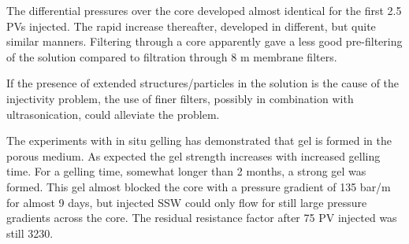 \documentclass[journal = enfuem, manuscript =  article]{achemso}
\begin{document}
The differential pressures over the core developed almost identical for the first 2.5 PVs injected. The rapid increase thereafter, developed in different, but quite similar manners. Filtering through a core apparently gave a less good pre-filtering of the solution compared to filtration through 8 \micro m membrane filters.

If the presence of extended structures/particles in the solution is the cause of the injectivity problem, the use of finer filters, possibly in combination with ultrasonication, could alleviate the problem.

The experiments with in situ gelling has demonstrated that gel is formed in the porous medium. As expected the gel strength increases with increased gelling time. For a gelling time, somewhat longer than 2 months, a strong gel was formed. This gel almost blocked the core with a pressure gradient of 135 bar/m for almost 9 days, but injected SSW could only flow for still large pressure gradients across the core. The residual resistance factor after 75 PV injected was still 3230.




\newpage

\end{document}
